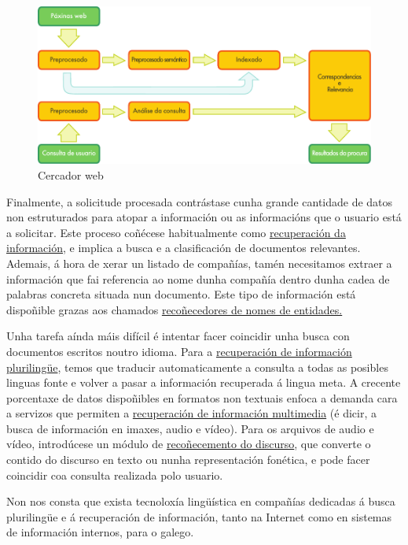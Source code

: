 \begin{multicols}{2}
\begin{figure}[htb]
  \vspace{-9mm}
  \center
  \includegraphics[width=\textwidth]{../_media/galician/web_search_architecture}
  \vspace{-5mm}
  \caption{Cercador web}
  \label{fig:websearcharch_ca}
\end{figure}

Finalmente, a solicitude procesada contrástase cunha grande cantidade de datos non estruturados para atopar a información ou as informacións que o usuario está a solicitar. Este proceso coñécese habitualmente como \uline{recuperación da información}, e implica a busca e a clasificación de documentos relevantes. Ademais, á hora de xerar un listado de compañías, tamén necesitamos extraer a información que fai referencia ao nome dunha compañía dentro dunha cadea de palabras concreta situada nun documento. Este tipo de información está dispoñible grazas aos chamados \uline{recoñecedores de nomes de entidades.} 

Unha tarefa aínda máis difícil é intentar facer coincidir unha busca con documentos escritos noutro idioma. Para a \uline{recuperación de información plurilingüe}, temos que traducir automaticamente a consulta a todas as posibles linguas fonte e volver a pasar a información recuperada á lingua meta. A crecente porcentaxe de datos dispoñibles en formatos non textuais enfoca a demanda cara a servizos que permiten a \uline{recuperación de información multimedia} (é dicir, a busca de información en imaxes, audio e vídeo). Para os arquivos de audio e vídeo, introdúcese un módulo de \uline{recoñecemento do discurso}, que converte o contido do discurso en texto ou nunha representación fonética, e pode facer coincidir coa consulta realizada polo usuario.

Non nos consta que exista tecnoloxía lingüística en compañías dedicadas á busca plurilingüe e á recuperación de información, tanto na Internet como en sistemas de información internos, para o galego. 


\end{multicols}
